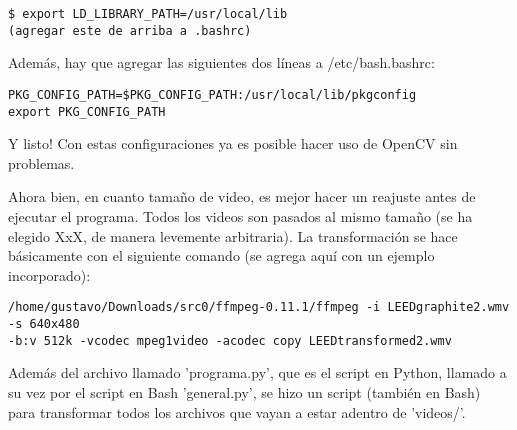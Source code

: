 \documentclass[letter]{article}
\begin{document}
\begin{lstlisting}
$ export LD_LIBRARY_PATH=/usr/local/lib
(agregar este de arriba a .bashrc)
\end{lstlisting}

Además, hay que agregar las siguientes dos líneas a /etc/bash.bashrc:

\begin{lstlisting}
PKG_CONFIG_PATH=$PKG_CONFIG_PATH:/usr/local/lib/pkgconfig
export PKG_CONFIG_PATH
\end{lstlisting}

Y listo! Con estas configuraciones ya es posible hacer uso de OpenCV sin problemas.

Ahora bien, en cuanto tamaño de video, es mejor hacer un reajuste antes de ejecutar el programa. Todos los videos son pasados al mismo tamaño (se ha elegido XxX, de manera levemente arbitraria). La transformación se hace básicamente con el siguiente comando (se agrega aquí con un ejemplo incorporado):

\begin{lstlisting}
/home/gustavo/Downloads/src0/ffmpeg-0.11.1/ffmpeg -i LEEDgraphite2.wmv -s 640x480
-b:v 512k -vcodec mpeg1video -acodec copy LEEDtransformed2.wmv
\end{lstlisting}

Además del archivo llamado 'programa.py', que es el script en Python, llamado a su vez por el script en Bash 'general.py', se hizo un script (también en Bash) para transformar todos los archivos que vayan a estar adentro de 'videos/'.
\end{document}
